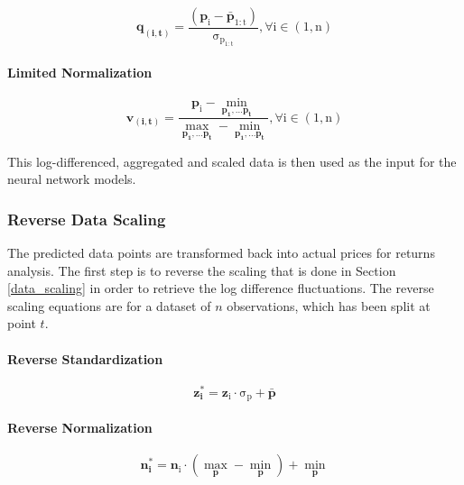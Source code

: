 \documentclass[a4paper,11pt,oneside]{article}
\theoremstyle{plain}
\theoremstyle{definition}
\begin{document}
	\begin{equation}
	\mathbf{q_{(i, t)}} =\mathrm{ \frac{(\mathbf{p}_i - \bar{\mathbf{p}}_{1:t}) }{\sigma_{p_{1:t}}} , \forall  i \in (1, n)}
	\end{equation}
	
	\paragraph{Limited Normalization}
	
	\begin{equation}\label{eq_ltd_normalize}
	\mathbf{v_{(i, t)}}  = 
	\mathrm{ \frac{\mathbf{p}_i - \min\limits_{\mathbf{p_1},\dots\mathbf{p_t}}} 
		{\max\limits_{\mathbf{p_1},\dots\mathbf{p_t}} - \min\limits_{\mathbf{p_1},\dots\mathbf{p_t}}} 
		, \forall  i \in (1, n)}
	\end{equation}
	
	
	This log-differenced, aggregated and scaled data is then used as the input for the neural network models.
	
	\subsubsection{Reverse Data Scaling}\label{data_reverse_scaling}
	
	The predicted data points are transformed back into actual prices for returns analysis. The first step is to reverse the scaling that is done in Section \ref{data_scaling} in order to retrieve the log difference fluctuations. The reverse scaling equations are for a dataset of $n$ observations, which has been split at point $t$.
	
	\paragraph{Reverse Standardization}
	
	\begin{equation}
	\mathbf{z^{*}_i} = \mathrm{{\mathbf{z}_i} \cdot \sigma_p + \mathbf{\bar{p}}}
	\end{equation}
	
	\paragraph{Reverse Normalization}
	
	\begin{equation}
	\mathbf{n^{*}_i} = \mathrm{\mathbf{n}_i \cdot \left(\max_{\mathbf{p}} - \min_{\mathbf{p}}\right) + \min_{\mathbf{p}}}
	\end{equation}
	
\end{document}
